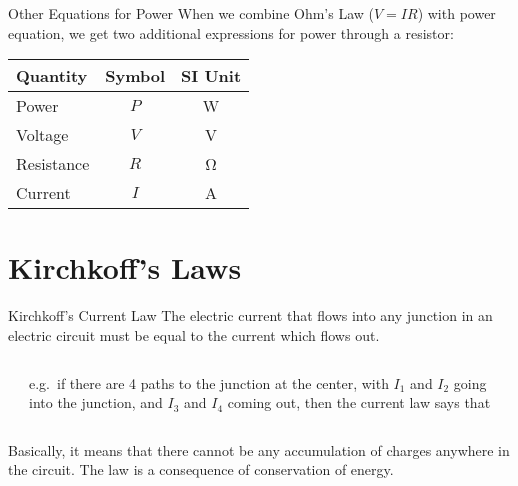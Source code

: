 \documentclass[12pt,aspectratio=169]{beamer}
\newcommand{\eq}[2]{\vspace{#1}{\Large\begin{displaymath}#2\end{displaymath}}}
\begin{document}
\begin{frame}{Other Equations for Power}
  When we combine Ohm's Law ($V=IR$) with power equation, we get two additional
  expressions for power through a resistor:

  \eq{-.2in}{
    \boxed{P=\frac{V^2}{R}}\quad\boxed{P=I^2R}
  }
  \begin{center}
    \begin{tabular}{l|c|c}
      \rowcolor{pink}
      \textbf{Quantity} & \textbf{Symbol} & \textbf{SI Unit} \\ \hline
      Power      & $P$ & \si{\watt} \\
      Voltage    & $V$ & \si{\volt} \\
      Resistance & $R$ & \si{\ohm}  \\
      Current    & $I$ & \si{\ampere}
    \end{tabular}
  \end{center}
\end{frame}


\section{Kirchkoff's Laws}

\begin{frame}{Kirchkoff's Current Law}
  The electric current that flows into any junction in an electric circuit must
  be equal to the current which flows out.

  \vspace{.2in}
  \begin{columns}
    \begin{center}
    \end{center}
    
    e.g.\ if there are 4 paths to the junction at the center, with $I_1$ and
    $I_2$ going into the junction, and $I_3$ and $I_4$ coming out, then the
    current law says that

    \eq{-.3in}{
      I_1+I_2-I_3-I_4=0
    }
  \end{columns}

  \vspace{.2in}Basically, it means that there cannot be any accumulation of
  charges anywhere in the circuit. The law is a consequence of conservation of
  energy.
\end{frame}
\end{document}
